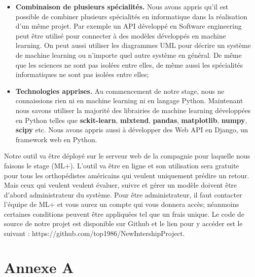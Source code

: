 \documentclass[12pt, french]{report}
\begin{document}
\begin{itemize}
\item \textbf{Combinaison de plusieurs spécialités.} Nous avons appris qu'il est possible de combiner plusieurs spécialités en informatique dans la réalisation d'un même projet. Par exemple un API développé en Software engineering peut être utilisé pour connecter à des modèles développés en machine learning. On peut aussi utiliser les diagrammes UML pour décrire un système de machine learning ou n'importe quel autre système en général. De même que les sciences ne sont pas isolées entre elles, de même aussi les spécialités informatiques ne sont pas isolées entre elles;
\item \textbf{Technologies apprises.}  Au commencement de notre stage, nous ne connaissions rien ni en machine learning ni en langage Python. Maintenant nous savons utiliser la majorité des librairies de machine learning développées en Python telles que \textbf{sckit-learn}, \textbf{mlxtend}, \textbf{pandas}, \textbf{matplotlib}, \textbf{numpy}, \textbf{scipy} etc. Nous avons appris aussi à développer des Web API en Django, un framework web en Python. 
\end{itemize}

Notre outil va être déployé sur le serveur web de la compagnie pour laquelle nous faisons le stage (ML+). L'outil va être en ligne et son utilisation sera gratuite pour tous les orthopédistes américains qui veulent uniquement prédire un retour. Mais ceux qui veulent veulent évaluer, suivre et gérer un modèle doivent être d'abord administrateur du système. Pour être administrateur, il faut contacter l'équipe de ML+ et vous aurez un compte qui vous donnera accès; néanmoins certaines conditions peuvent être appliquées tel que un frais unique. Le code de source de notre projet est disponible sur Github et le lien pour y accéder est le suivant : https://github.com/top1986/NewIntershipProject.   


\newpage

\appendix
\chapter{Annexe A}

\end{document}

